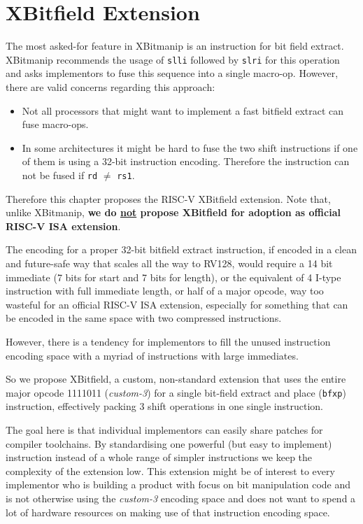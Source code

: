 \chapter{XBitfield Extension}

The most asked-for feature in XBitmanip is an instruction for bit field
extract. XBitmanip recommends the usage of {\tt slli} followed by {\tt slri}
for this operation and asks implementors to fuse this sequence into a single
macro-op. However, there are valid concerns regarding this approach:

\begin{itemize}
\item Not all processors that might want to implement a fast bitfield extract
can fuse macro-ops.
\item In some architectures it might be hard to fuse the two shift instructions
if one of them is using a 32-bit instruction encoding. Therefore the instruction
can not be fused if {\tt rd} $\ne$ {\tt rs1}.
\end{itemize}

Therefore this chapter proposes the RISC-V XBitfield extension. Note that, unlike
XBitmanip, {\bf we do \underline{not} propose XBitfield for adoption as official RISC-V ISA extension}.

The encoding for a proper 32-bit bitfield extract instruction, if encoded
in a clean and future-safe way that scales all the way to RV128, would require
a 14 bit immediate (7 bits for start and 7 bits for length), or the equivalent
of 4 I-type instruction with full immediate length, or half of a major opcode,
way too wasteful for an official RISC-V ISA extension, especially for something
that can be encoded in the same space with two compressed instructions.

However, there is a tendency for implementors to fill the unused instruction
encoding space with a myriad of instructions with large immediates.~\cite{Ri5cy}

So we propose XBitfield, a custom, non-standard extension that uses the entire
major opcode 1111011 ({\it custom-3}) for a single bit-field extract and place
({\tt bfxp}) instruction, effectively packing 3 shift operations in one single
instruction.

The goal here is that individual implementors can easily share patches for
compiler toolchains. By standardising one powerful (but easy to implement)
instruction instead of a whole range of simpler instructions we keep the
complexity of the extension low. This extension might be of interest to
every implementor who is building a product with focus on bit manipulation
code and is not otherwise using the {\it custom-3} encoding space and does not
want to spend a lot of hardware resources on making use of that instruction
encoding space.


